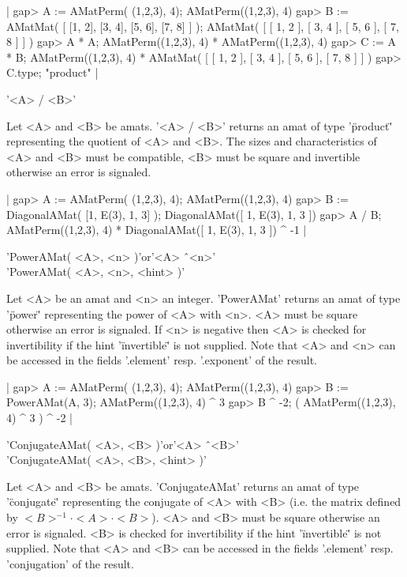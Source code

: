|    gap> A := AMatPerm( (1,2,3), 4);
    AMatPerm((1,2,3), 4)
    gap> B := AMatMat( [ [1, 2], [3, 4], [5, 6], [7, 8] ] );
    AMatMat(
      [ [ 1, 2 ], [ 3, 4 ], [ 5, 6 ], [ 7, 8 ] ]
    )
    gap> A * A;
    AMatPerm((1,2,3), 4) *
    AMatPerm((1,2,3), 4)
    gap> C := A * B;
    AMatPerm((1,2,3), 4) *
    AMatMat(
      [ [ 1, 2 ], [ 3, 4 ], [ 5, 6 ], [ 7, 8 ] ]
    ) 
    gap> C.type;
    "product" |

'<A> / <B>'

Let <A> and <B> be amats. '<A> / <B>' returns an amat of
type '\"product\"' representing the quotient of <A> and <B>.
The sizes and characteristics of <A> and <B> must be compatible, 
<B> must be square and invertible otherwise an error is signaled.

|    gap> A := AMatPerm( (1,2,3), 4);
    AMatPerm((1,2,3), 4)
    gap> B := DiagonalAMat( [1, E(3), 1, 3] );
    DiagonalAMat([ 1, E(3), 1, 3 ])
    gap> A / B;
    AMatPerm((1,2,3), 4) *
    DiagonalAMat([ 1, E(3), 1, 3 ]) ^ -1 |


'PowerAMat( <A>, <n> )'\quad or\quad '<A> \^\ <n>'\\
'PowerAMat( <A>, <n>, <hint> )'

Let <A> be an amat and <n> an integer. 'PowerAMat' returns 
an amat of type '\"power\"' representing the power of <A> with <n>.
<A> must be square otherwise an error is signaled. If <n> is 
negative then <A> is checked for invertibility if the
hint '\"invertible\"' is not supplied.
Note that <A> and <n> can be accessed in the fields 
'.element' resp. '.exponent' of the result.

|    gap> A := AMatPerm( (1,2,3), 4);
    AMatPerm((1,2,3), 4)
    gap> B := PowerAMat(A, 3);      
    AMatPerm((1,2,3), 4) ^ 3
    gap> B ^ -2;
    ( AMatPerm((1,2,3), 4) ^ 3
    ) ^ -2 |


'ConjugateAMat( <A>, <B> )'\quad or\quad '<A> \^\ <B>'\\
'ConjugateAMat( <A>, <B>, <hint> )'

Let <A> and <B> be amats. 'ConjugateAMat' returns 
an amat of type '\"conjugate\"' representing the conjugate of 
<A> with <B> (i.e. the matrix defined by $<B>^{-1}\cdot<A>\cdot<B>$).
<A> and <B> must be square otherwise an error is signaled. 
<B> is checked for invertibility if the
hint '\"invertible\"' is not supplied.
Note that <A> and <B> can be accessed in the fields '.element' 
resp. 'conjugation' of the result.


